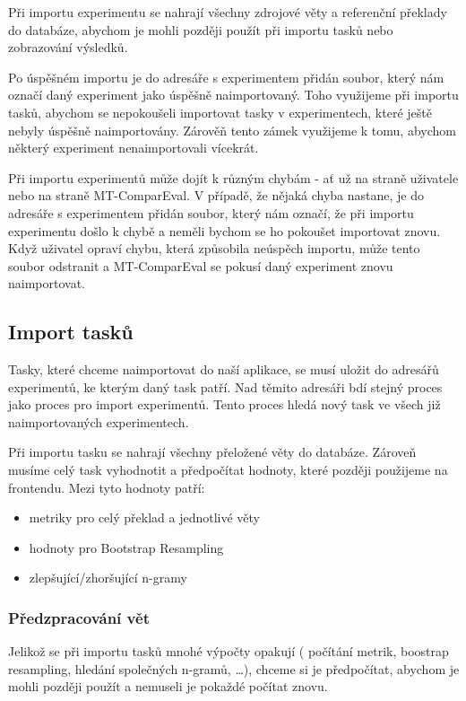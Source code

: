 Při importu experimentu se nahrají všechny zdrojové věty
  a referenční překlady do databáze,
  abychom je mohli později použít při importu tasků
  nebo zobrazování výsledků.

Po úspěšném importu je do adresáře s experimentem přidán soubor,
  který nám označí daný experiment jako úspěšně naimportovaný.
Toho využijeme při importu tasků,
  abychom se nepokoušeli importovat tasky v experimentech,
  které ještě nebyly úspěšně naimportovány.
Zárověň tento zámek využijeme k tomu,
  abychom některý experiment nenaimportovali vícekrát.

Při importu experimentů může dojít k různým chybám -
  ať už na straně uživatele nebo na straně MT-ComparEval.
V případě, že nějaká chyba nastane,
  je do adresáře s experimentem přidán soubor,
  který nám označí,
  že při importu experimentu došlo k chybě
  a neměli bychom se ho pokoušet importovat znovu.
Když uživatel opraví chybu,
  která způsobila neúspěch importu,
  může tento soubor odstranit
  a MT-ComparEval se pokusí daný experiment znovu naimportovat.

\subsection{Import tasků}
Tasky, které chceme naimportovat do naší aplikace,
  se musí uložit do adresářů experimentů,
  ke kterým daný task patří.
Nad těmito adresáři bdí stejný proces
  jako proces pro import experimentů.
Tento proces hledá nový task ve všech již 
  naimportovaných experimentech.

Při importu tasku se nahrají všechny přeložené věty do databáze.
Zároveň musíme celý task vyhodnotit a předpočítat hodnoty,
  které později použijeme na frontendu.
Mezi tyto hodnoty patří:
\begin{itemize}
	\item metriky pro celý překlad a jednotlivé věty
	\item hodnoty pro Bootstrap Resampling 
	\item zlepšující/zhoršující n-gramy
\end{itemize}

\subsubsection{Předzpracování vět}
Jelikož se při importu tasků mnohé výpočty opakují
  ( počítání metrik, boostrap resampling, hledání společných n-gramů, \dots ),
  chceme si je předpočítat,
  abychom je mohli později použít a nemuseli je pokaždé počítat znovu.

